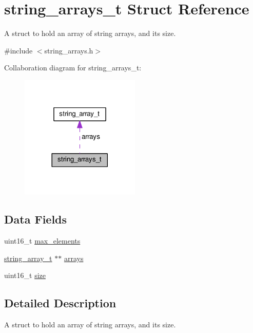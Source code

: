 \hypertarget{structstring__arrays__t}{}\section{string\+\_\+arrays\+\_\+t Struct Reference}
\label{structstring__arrays__t}


A struct to hold an array of string arrays, and its size.  




{\ttfamily \#include $<$string\+\_\+arrays.\+h$>$}



Collaboration diagram for string\+\_\+arrays\+\_\+t\+:\nopagebreak
\begin{figure}[H]
\begin{center}
\leavevmode
\includegraphics[width=161pt]{structstring__arrays__t__coll__graph}
\end{center}
\end{figure}
\subsection*{Data Fields}
\begin{DoxyCompactItemize}
\item 
uint16\+\_\+t \hyperlink{structstring__arrays__t_a44302bf32cb7eede15f027da880e884e}{max\+\_\+elements}
\item 
\hyperlink{structstring__array__t}{string\+\_\+array\+\_\+t} $\ast$$\ast$ \hyperlink{structstring__arrays__t_a6ff6c8bd382d230f4538415fbf78765e}{arrays}
\item 
uint16\+\_\+t \hyperlink{structstring__arrays__t_a0df76b18c735586cd916029fd8d63d9b}{size}
\end{DoxyCompactItemize}


\subsection{Detailed Description}
A struct to hold an array of string arrays, and its size. 

